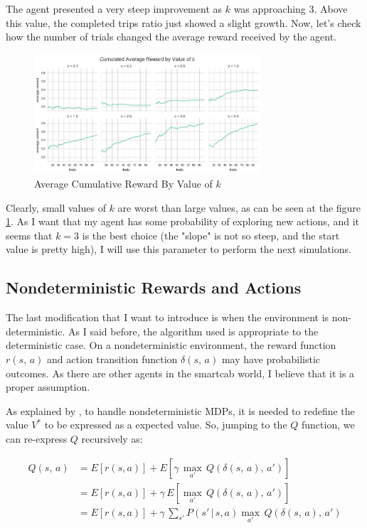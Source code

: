 \documentclass[a4paper]{article}
\begin{document}
\newpage
The agent presented a very steep improvement as $k$ was approaching $3$. Above this value, the completed trips ratio just showed a slight growth. Now, let's check how the number of trials changed the average reward received by the agent.

\begin{figure}[ht!]
\centering
\includegraphics[width=0.75\textwidth]{images/cum_reward_by_k.png}
\caption{\label{fig:cum_reward_by_k}Average Cumulative Reward By Value of $k$}
\end{figure}

Clearly, small values of $k$ are worst than large values, as can be seen at the figure \ref{fig:cum_reward_by_k}. As I want that my agent has some probability of exploring new actions, and it seems that $k=3$ is the best choice (the "slope" is not so steep, and the start value is pretty high), I will use this parameter to perform the next simulations.

\subsection{Nondeterministic Rewards and Actions}
The last modification that I want to introduce is when the environment is non-deterministic. As I said before, the algorithm used is appropriate to the deterministic case. On a nondeterministic environment, the reward function $r(s,\,a)$ and action transition function $\delta(s,\,a)$ may have probabilistic outcomes. As there are other agents in the smartcab world, I believe that it is a proper assumption.

As explained by \cite{Mitchell}, to handle nondeterministic MDPs, it is needed to redefine the value $V^{*}$ to be expressed as a expected value. So, jumping to the $Q$ function, we can re-express $Q$ recursively as:

\begin{equation}
\begin{aligned}
Q(s, \, a) &= E \left [r(s, a) \right ] + E \left [\gamma \, \underset{a'}{\max} \, Q(\delta(s,\, a), \, a')\right ]\\
&= E \left [r(s, a) \right ] + \gamma \,  E \left [\underset{a'}{\max} \, Q(\delta(s,\, a), \, a')\right ]\\
&= E \left [r(s, a) \right ] + \gamma \,  \sum_{s'} P\left(s' \,| \,s, a   \right) \underset{a'}{\max} \, Q(\delta(s,\, a), \, a')
\end{aligned}
\end{equation}
\end{document}
